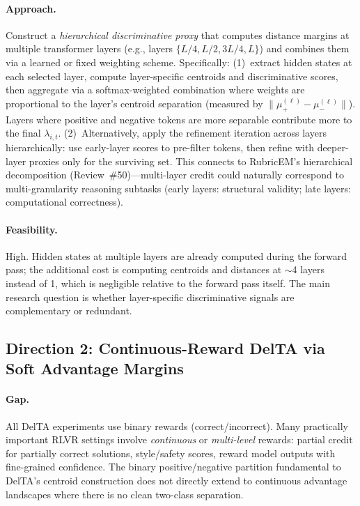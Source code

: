 \documentclass[11pt,a4paper]{article}
\begin{document}
\paragraph{Approach.}
Construct a \emph{hierarchical discriminative proxy} that computes distance margins at multiple transformer layers (e.g., layers $\{L/4, L/2, 3L/4, L\}$) and combines them via a learned or fixed weighting scheme. Specifically: (1)~extract hidden states at each selected layer, compute layer-specific centroids and discriminative scores, then aggregate via a softmax-weighted combination where weights are proportional to the layer's centroid separation (measured by $\|\mu_+^{(\ell)} - \mu_-^{(\ell)}\|$). Layers where positive and negative tokens are more separable contribute more to the final $\lambda_{i,t}$. (2)~Alternatively, apply the refinement iteration across layers hierarchically: use early-layer scores to pre-filter tokens, then refine with deeper-layer proxies only for the surviving set. This connects to RubricEM's hierarchical decomposition (Review~\#50)---multi-layer credit could naturally correspond to multi-granularity reasoning subtasks (early layers: structural validity; late layers: computational correctness).

\paragraph{Feasibility.}
High. Hidden states at multiple layers are already computed during the forward pass; the additional cost is computing centroids and distances at $\sim$4 layers instead of 1, which is negligible relative to the forward pass itself. The main research question is whether layer-specific discriminative signals are complementary or redundant.

\subsection*{Direction 2: Continuous-Reward DelTA via Soft Advantage Margins}

\paragraph{Gap.}
All DelTA experiments use binary rewards (correct/incorrect). Many practically important RLVR settings involve \emph{continuous} or \emph{multi-level} rewards: partial credit for partially correct solutions, style/safety scores, reward model outputs with fine-grained confidence. The binary positive/negative partition fundamental to DelTA's centroid construction does not directly extend to continuous advantage landscapes where there is no clean two-class separation.
\end{document}
